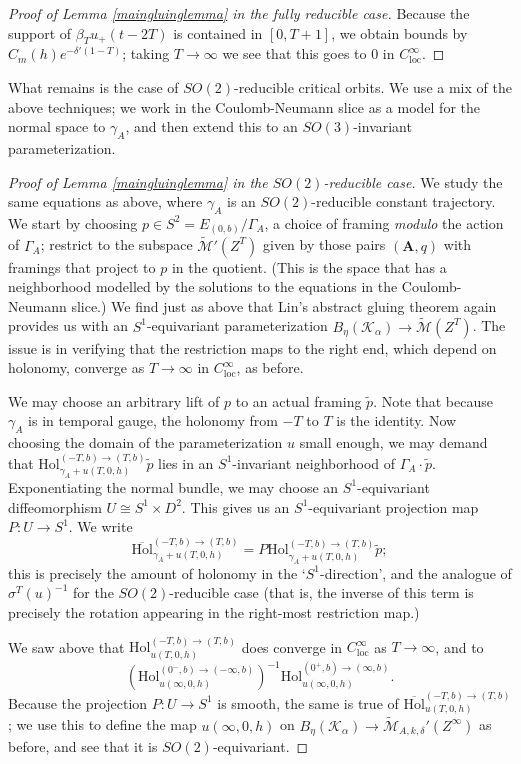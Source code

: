 \documentclass[10pt,a4paper]{amsart}
\theoremstyle{definition}
\theoremstyle{remark}
\numberwithin{figure}{qchap}
\begin{document}
\begin{proof}[Proof of Lemma \ref{maingluinglemma} in the fully reducible case]
Because the support of $\beta_T u_+(t-2T)$ is contained in $[0, T+1]$, we obtain bounds by $C_m(h) e^{- \delta'(1-T)}$; taking $T \to \infty$ we see that this goes to $0$ in $C^\infty_{\text{loc}}$.
\end{proof}

What remains is the case of $SO(2)$-reducible critical orbits. We use a mix of the above techniques; we work in the Coulomb-Neumann slice as a model for the normal space to $\gamma_A$, and then extend this to an $SO(3)$-invariant parameterization.

\begin{proof}[Proof of Lemma \ref{maingluinglemma} in the $SO(2)$-reducible case]
We study the same equations as above, where $\gamma_A$ is an $SO(2)$-reducible constant trajectory. We start by choosing $p \in S^2 = E_{(0,b)}/\Gamma_A$, a choice of framing \emph{modulo} the action of $\Gamma_A$; restrict to the subspace $\widetilde{\mathcal M}'(Z^T)$ given by those pairs $(\mathbf{A},q)$ with framings that project to $p$ in the quotient. (This is the space that has a neighborhood modelled by the solutions to the equations in the Coulomb-Neumann slice.) We find just as above that Lin's abstract gluing theorem again provides us with an $S^1$-equivariant parameterization $B_\eta(\mathcal K_\alpha) \to \widetilde{\mathcal M}(Z^T)$. The issue is in verifying that the restriction maps to the right end, which depend on holonomy, converge as $T \to \infty$ in $C^\infty_{\text{loc}}$, as before.

We may choose an arbitrary lift of $p$ to an actual framing $\tilde p$. Note that because $\gamma_A$ is in temporal gauge, the holonomy from $-T$ to $T$ is the identity. Now choosing the domain of the parameterization $u$ small enough, we may demand that $\text{Hol}^{(-T,b) \to (T, b)}_{\gamma_A + u(T, 0, h)} \tilde p$ lies in an $S^1$-invariant neighborhood of $\Gamma_A \cdot \tilde p$. Exponentiating the normal bundle, we may choose an $S^1$-equivariant diffeomorphism $U \cong S^1 \times D^2$. This gives us an $S^1$-equivariant projection map $P: U \to S^1$. We write $$\overline{\text{Hol}}^{(-T,b) \to (T,b)}_{\gamma_A + u(T,0,h)} = P\text{Hol}^{(-T,b) \to (T,b)}_{\gamma_A + u(T,0,h)}\tilde p;$$ this is precisely the amount of holonomy in the `$S^1$-direction', and the analogue of $\sigma^T(u)^{-1}$ for the $SO(2)$-reducible case (that is, the inverse of this term is precisely the rotation appearing in the right-most restriction map.)

We saw above that $\text{Hol}^{(-T,b) \to (T,b)}_{u(T, 0, h)}$ does converge in $C^\infty_{\text{loc}}$ as $T \to \infty$, and to $$\left(\text{Hol}^{(0^-, b) \to (-\infty, b)}_{u(\infty, 0, h)}\right)^{-1} \text{Hol}^{(0^+, b) \to (\infty, b)}_{u(\infty, 0, h)}.$$ Because the projection $P: U \to S^1$ is smooth, the same is true of $\overline{\text{Hol}}^{(-T,b) \to (T,b)}_{u(T, 0, h)}$; we use this to define the map $u(\infty, 0, h)$ on $B_\eta(\mathcal K_\alpha) \to \widetilde{\mathcal M}_{A,k,\delta}'(Z^\infty)$ as before, and see that it is $SO(2)$-equivariant.


\end{proof}
\end{document}
